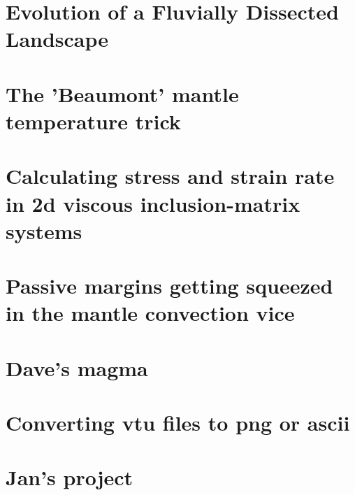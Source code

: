 \documentclass[a4paper,11pt]{report}
\begin{document}
\chapter{Evolution of a Fluvially Dissected Landscape \label{f140}} %

\chapter{The 'Beaumont' mantle temperature trick \label{f141}} %

\chapter{Calculating stress and strain rate in 2d viscous inclusion-matrix systems \label{f142}} %

\chapter{Passive margins getting squeezed in the mantle convection vice \label{f143}} %

\chapter{Dave's magma \label{f144}} %

\chapter{Converting vtu files to png or ascii \label{f145}} %

\chapter{Jan's project \label{f146}} %
\end{document}

